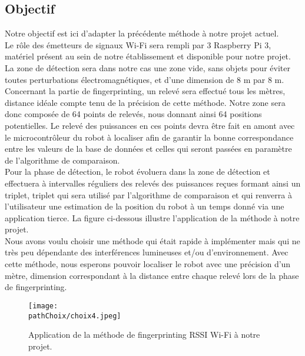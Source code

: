 \subsection{Objectif}
Notre objectif est ici d'adapter la précédente méthode à notre projet actuel.
\medskip
\\
Le rôle des émetteurs de signaux Wi-Fi sera rempli par 3 Raspberry Pi 3, matériel présent au sein de notre établissement et disponible pour notre projet.
La zone de détection sera dans notre cas une zone vide, sans objets pour éviter toutes perturbations électromagnétiques, et d'une dimension de 8 m par 8 m.
\medskip
\\
Concernant la partie de fingerprinting, un relevé sera effectué tous les mètres, distance idéale compte tenu de la précision de cette méthode. 
Notre zone sera donc composée de 64 points de relevés, nous donnant ainsi 64 positions potentielles.
Le relevé des puissances en ces points devra être fait en amont avec le microcontrôleur du robot à localiser afin de garantir la bonne correspondance entre les valeurs de la base de données et celles qui seront passées en paramètre de l'algorithme de comparaison. 
\medskip
\\
Pour la phase de détection, le robot évoluera dans la zone de détection et effectuera à intervalles réguliers des relevés des puissances reçues formant ainsi un triplet, triplet qui sera utilisé par l'algorithme de comparaison et qui renverra 
à l'utilisateur une estimation de la position du robot à un temps donné via une application tierce. La figure ci-dessous illustre l'application de la méthode à notre projet. 
\medskip
\\
Nous avons voulu choisir une méthode qui était rapide à implémenter mais qui ne très peu dépendante   des interférences lumineuses et/ou d'environnement.
Avec cette méthode, nous esperons pouvoir localiser le robot avec une précision d'un mètre, dimension correspondant à la distance entre chaque relevé lors de la phase de fingerprinting. 

\begin{figure}[H]
\centering
\texttt{[image: \\pathChoix/choix4.jpeg]}
\caption{Application de la méthode de fingerprinting RSSI Wi-Fi à notre projet.}
\end{figure}
\newpage

